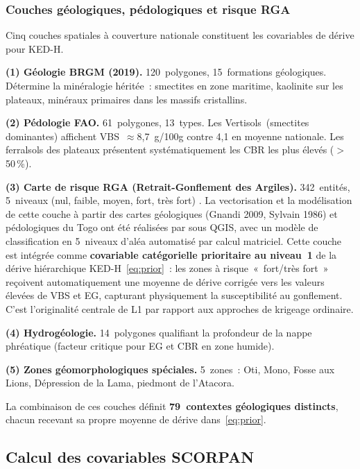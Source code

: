 \documentclass[10pt,a4paper,twocolumn]{article}
\begin{document}
	\subsubsection{Couches géologiques, pédologiques et risque RGA}
	
	Cinq couches spatiales à couverture nationale constituent les
	covariables de dérive pour KED-H.
	
	\textbf{(1) Géologie BRGM (2019).}
	120~polygones, 15~formations géologiques.
	Détermine la minéralogie héritée~: smectites en zone maritime,
	kaolinite sur les plateaux, minéraux primaires dans les massifs
	cristallins.
	
	\textbf{(2) Pédologie FAO.}
	61~polygones, 13~types.
	Les Vertisols~(smectites dominantes) affichent
	VBS~$\approx$8{,}7~g/100g contre 4{,}1 en moyenne nationale.
	Les ferralsols des plateaux présentent systématiquement les CBR
	les plus élevés ($>$50\,\%).
	
	\textbf{(3) Carte de risque RGA
		(Retrait-Gonflement des Argiles).}
	342~entités, 5~niveaux (nul, faible, moyen, fort, très fort)
	\cite{chassagneux1996}.
	La vectorisation et la modélisation de cette couche à partir
	des cartes géologiques (Gnandi 2009, Sylvain 1986) et pédologiques
	du Togo ont été réalisées par \textcite{bassafoula2025integration}
	sous QGIS, avec un modèle de classification en 5~niveaux
	d'aléa automatisé par calcul matriciel.
	Cette couche est intégrée comme \textbf{covariable catégorielle
		prioritaire au niveau~1} de la dérive hiérarchique
	KED-H~\eqref{eq:prior}~: les zones à risque~«~fort/très fort~»
	reçoivent automatiquement une moyenne de dérive corrigée vers
	les valeurs élevées de VBS et EG, capturant physiquement la
	susceptibilité au gonflement.
	C'est l'originalité centrale de L1 par rapport aux approches
	de krigeage ordinaire.
	
	\textbf{(4) Hydrogéologie.}
	14~polygones qualifiant la profondeur de la nappe phréatique
	(facteur critique pour EG et CBR en zone humide).
	
	\textbf{(5) Zones géomorphologiques spéciales.}
	5~zones~: Oti, Mono, Fosse aux Lions, Dépression de la Lama,
	piedmont de l'Atacora.
	
	La combinaison de ces couches définit
	\textbf{79~contextes géologiques distincts}, chacun recevant
	sa propre moyenne de dérive dans~\eqref{eq:prior}.
	
	\subsection{Calcul des covariables SCORPAN}
	\label{sec:covariables}
	
\end{document}
